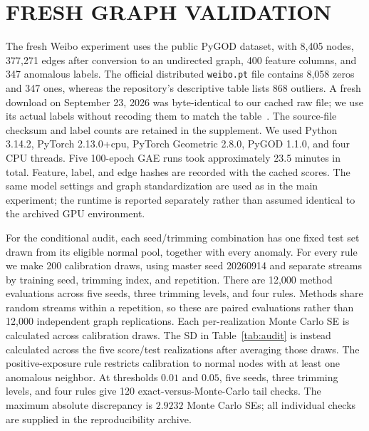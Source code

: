 \documentclass[twoside]{article}
\begin{document}
\section{FRESH GRAPH VALIDATION}
\label{app:fresh}
\begin{table}[t]
\centering\small
\caption{Complete fresh conditional graph audit, including positive-exposure and larger-random calibration. Each cell averages 200 calibration draws, then reports mean and SD across five score/test realizations. The positive-exposure pool is the binding size constraint in these runs, making its matched calibration draw deterministic once the test set is fixed.}
\label{tab:audit}
\end{table}
The fresh Weibo experiment uses the public PyGOD dataset, with 8,405 nodes, 377,271 edges after conversion to an undirected graph, 400 feature columns, and 347 anomalous labels. The official distributed \texttt{weibo.pt} file contains 8,058 zeros and 347 ones, whereas the repository's descriptive table lists 868 outliers. A fresh download on September 23, 2026 was byte-identical to our cached raw file; we use its actual labels without recoding them to match the table~\citep{pygoddata}. The source-file checksum and label counts are retained in the supplement. We used Python 3.14.2, PyTorch 2.13.0+cpu, PyTorch Geometric 2.8.0, PyGOD 1.1.0, and four CPU threads. Five 100-epoch GAE runs took approximately 23.5 minutes in total. Feature, label, and edge hashes are recorded with the cached scores. The same model settings and graph standardization are used as in the main experiment; the runtime is reported separately rather than assumed identical to the archived GPU environment.

For the conditional audit, each seed/trimming combination has one fixed test set drawn from its eligible normal pool, together with every anomaly. For every rule we make 200 calibration draws, using master seed 20260914 and separate streams by training seed, trimming index, and repetition. There are 12,000 method evaluations across five seeds, three trimming levels, and four rules. Methods share random streams within a repetition, so these are paired evaluations rather than 12,000 independent graph replications. Each per-realization Monte Carlo SE is calculated across calibration draws. The SD in Table~\ref{tab:audit} is instead calculated across the five score/test realizations after averaging those draws. The positive-exposure rule restricts calibration to normal nodes with at least one anomalous neighbor. At thresholds $0.01$ and $0.05$, five seeds, three trimming levels, and four rules give 120 exact-versus-Monte-Carlo tail checks. The maximum absolute discrepancy is $2.9232$ Monte Carlo SEs; all individual checks are supplied in the reproducibility archive.
\end{document}
